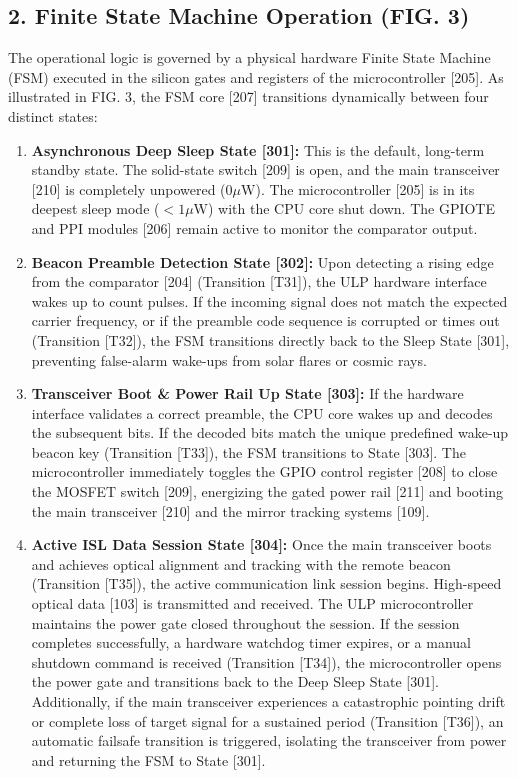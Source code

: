 \documentclass[12pt,a4paper]{article}
\begin{document}
\subsection*{2. Finite State Machine Operation (FIG. 3)}
The operational logic is governed by a physical hardware Finite State Machine (FSM) executed in the silicon gates and registers of the microcontroller [205]. As illustrated in FIG. 3, the FSM core [207] transitions dynamically between four distinct states:

\begin{enumerate}
  \item \textbf{Asynchronous Deep Sleep State [301]:} This is the default, long-term standby state. The solid-state switch [209] is open, and the main transceiver [210] is completely unpowered ($0\mu\text{W}$). The microcontroller [205] is in its deepest sleep mode ($<1\mu\text{W}$) with the CPU core shut down. The GPIOTE and PPI modules [206] remain active to monitor the comparator output.
  \item \textbf{Beacon Preamble Detection State [302]:} Upon detecting a rising edge from the comparator [204] (Transition [T31]), the ULP hardware interface wakes up to count pulses. If the incoming signal does not match the expected carrier frequency, or if the preamble code sequence is corrupted or times out (Transition [T32]), the FSM transitions directly back to the Sleep State [301], preventing false-alarm wake-ups from solar flares or cosmic rays.
  \item \textbf{Transceiver Boot \& Power Rail Up State [303]:} If the hardware interface validates a correct preamble, the CPU core wakes up and decodes the subsequent bits. If the decoded bits match the unique predefined wake-up beacon key (Transition [T33]), the FSM transitions to State [303]. The microcontroller immediately toggles the GPIO control register [208] to close the MOSFET switch [209], energizing the gated power rail [211] and booting the main transceiver [210] and the mirror tracking systems [109].
  \item \textbf{Active ISL Data Session State [304]:} Once the main transceiver boots and achieves optical alignment and tracking with the remote beacon (Transition [T35]), the active communication link session begins. High-speed optical data [103] is transmitted and received. The ULP microcontroller maintains the power gate closed throughout the session. If the session completes successfully, a hardware watchdog timer expires, or a manual shutdown command is received (Transition [T34]), the microcontroller opens the power gate and transitions back to the Deep Sleep State [301]. Additionally, if the main transceiver experiences a catastrophic pointing drift or complete loss of target signal for a sustained period (Transition [T36]), an automatic failsafe transition is triggered, isolating the transceiver from power and returning the FSM to State [301].
\end{enumerate}
\end{document}
